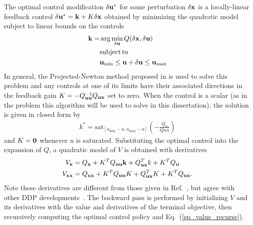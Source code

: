 The optimal control modification $\delta\mathbf{u}^*$ for some perturbation $\delta\mathbf{x}$ is a locally-linear feedback control $\delta\mathbf{u}^* = \mathbf{k} + K\delta\mathbf{x}$ obtained by minimizing the quadratic model subject to linear bounds on the controls
\begin{align}
	\mathbf{k} = &\arg\min_{\delta\mathbf{u}} Q(\delta\mathbf{x},\delta\mathbf{u}) \\
	&\mathrm{subject\,to\,\;} \nonumber\\
	&\mathbf{u}_{\min}\le \mathbf{u}+\delta\mathbf{u} \le\mathbf{u}_{\max}
\end{align}
In general, the Projected-Newton method proposed in \cite{DDP_ControlLimited} is used to solve this problem and any controls at one of its limits have their associated directions in the feedback gain $K = -Q_{\mathbf{u}\mathbf{u}}^{-1}Q_{\mathbf{u}\mathbf{x}}$ set to zero. When the control is a scalar (as in the problem this algorithm will be used to solve in this dissertation), the solution is given in closed form by
\begin{align}
k^* = \mathrm{sat}_{[u_{\min}-u,u_{\max}-u]}(-\frac{Q_u}{Quu})
\end{align}
and $K=\mathbf{0}$ whenever $u$ is saturated. 
 Substituting the optimal control into the expansion of $Q$, a quadratic model of $V$ is obtained with derivatives
\begin{align}
	\begin{split}
		\label{eq_value_recurse}
		V_{\mathbf{x}} &= Q_{\mathbf{x}} + K^TQ_{\mathbf{u}\mathbf{u}}\mathbf{k} + Q^T_{\mathbf{u}\mathbf{x}}k + K^TQ_{\mathbf{u}}\\
		V_{\mathbf{x}\mathbf{x}} &= Q_{\mathbf{x}\mathbf{x}} + K^TQ_{\mathbf{u}\mathbf{u}}K + Q^T_{\mathbf{u}\mathbf{x}}K + K^TQ_{\mathbf{u}\mathbf{x}}.
	\end{split}
\end{align}
Note these derivatives are different from those given in Ref.~\cite{DDP_ControlLimited}, but agree with other DDP developments~\cite{DDP2,DDP_NonlinearConstraints}.
The backward pass is performed by initializing $V$ and its derivatives with the value and derivatives of the terminal objective, then recursively computing the optimal control policy and Eq.~(\ref{eq_value_recurse}). 

